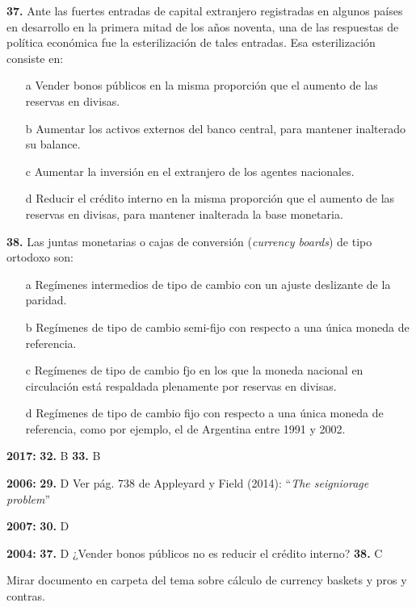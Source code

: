 \documentclass{nuevotema}
\begin{document}

\textbf{37.} Ante las fuertes entradas de capital extranjero registradas en algunos países en desarrollo en la primera mitad de los años noventa, una de las respuestas de política económica fue la esterilización de tales entradas. Esa esterilización consiste en:
\begin{itemize}
	\item[a] Vender bonos públicos en la misma proporción que el aumento de las reservas en divisas.
	\item[b] Aumentar los activos externos del banco central, para mantener inalterado su balance.
	\item[c] Aumentar la inversión en el extranjero de los agentes nacionales.
	\item[d] Reducir el crédito interno en la misma proporción que el aumento de las reservas en divisas, para mantener inalterada la base monetaria.
\end{itemize}

\textbf{38.} Las juntas monetarias o cajas de conversión (\textit{currency boards}) de tipo ortodoxo son:
\begin{itemize}
	\item[a] Regímenes intermedios de tipo de cambio con un ajuste deslizante de la paridad.
	\item[b] Regímenes de tipo de cambio semi-fijo con respecto a una única moneda de referencia.
	\item[c] Regímenes de tipo de cambio fjo en los que la moneda nacional en circulación está respaldada plenamente por reservas en divisas.
	\item[d] Regímenes de tipo de cambio fijo con respecto a una única moneda de referencia, como por ejemplo, el de Argentina entre 1991 y 2002.
\end{itemize}


\notas

\textbf{2017:} \textbf{32.} B \textbf{33.} B

\textbf{2006:} \textbf{29.} D Ver pág. 738 de Appleyard y Field (2014): ``\textit{The seigniorage problem}''

\textbf{2007:} \textbf{30.} D

\textbf{2004:} \textbf{37.} D ¿Vender bonos públicos no es reducir el crédito interno? \textbf{38.} C 

Mirar documento en carpeta del tema sobre cálculo de currency baskets y pros y contras.

\bibliografia
\end{document}
